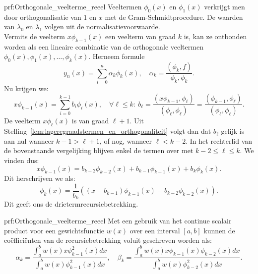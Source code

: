 \begin{prf}{prf:Orthogonale_veelterme_reeel} 
    Veeltermen $\phi_0(x)$ en $\phi_1(x)$ verkrijgt men door orthogonalisatie van $1$ en $x$ met de Gram-Schmidtprocedure. De waarden van $\lambda_0$ en $\lambda_1$ volgen uit de normalisatievoorwaarde. \\

    Vermits de veelterm $x\phi_{k-1}(x)$ een veelterm van graad $k$ is, kan ze ontbonden worden als een lineaire combinatie van de orthogonale veeltermen $\phi_0(x), \phi_1(x), \ldots, \phi_{k}(x)$. Herneem formule
    \begin{equation*}
        y_n(x) = \sum_{i=0}^{n} \alpha_k\phi_k(x), \quad \alpha_k = \frac{(\phi_k, f)}{\phi_k, \phi_k}.
    \end{equation*}
    Nu krijgen we:
    \begin{equation*}
        x\phi_{k-1}(x) = \sum_{i=0}^{k-1} b_i\phi_i(x), \quad \forall \ell \leq k: \ b_\ell = \frac{(x\phi_{k-1},\phi_\ell)}{(\phi_\ell,\phi_\ell)} = \frac{(\phi_{k-1},\phi_\ell)}{(\phi_\ell,\phi_\ell)}.
    \end{equation*}
    De veelterm $x\phi_{\ell}(x)$ is van graad $\ell+1$. Uit Stelling~\ref{lem:lageregraadstermen_en_orthogonaliteit} volgt dan dat $b_\ell$ gelijk is aan nul wanneer $k - 1 > \ell + 1$, of nog, wanneer $\ell < k - 2$. In het rechterlid van de bovenstaande vergelijking blijven enkel de termen over met $k - 2 \leq \ell \leq k$. We vinden dus: 
    \begin{equation*}
        x\phi_{k-1}(x) = b_{k-2}\phi_{k-2}(x) + b_{k-1}\phi_{k-1}(x) + b_k\phi_k(x).
    \end{equation*}
    Dit herschrijven we als:
    \begin{equation*}
        \phi_k(x) = \frac{1}{b_k}\left((x-b_{k-1})\phi_{k-1}(x) - b_{k-2}\phi_{k-2}(x)\right).
    \end{equation*}
    Dit geeft ons de drietermrecursiebetrekking. 
\end{prf}

\begin{app}{prf:Orthogonale_veelterme_reeel} 
    Met een gebruik van het continue scalair product voor een gewichtsfunctie $w(x)$ over een interval $[a,b]$ kunnen de coëfficiënten van de recursiebetrekking voluit geschreven worden als:
    \begin{equation*}
        \alpha_k = \frac{\int_{a}^{b}w(x)x\phi^2_{k-1}(x)dx}{\int_{a}^{b}w(x)\phi^2_{k-1}(x)dx}, \quad \beta_k = \frac{\int_{a}^{b}w(x)x\phi_{k-1}(x)\phi_{k-2}(x)dx}{\int_{a}^{b}w(x)\phi^2_{k-2}(x)dx}.
    \end{equation*}
\end{app}


